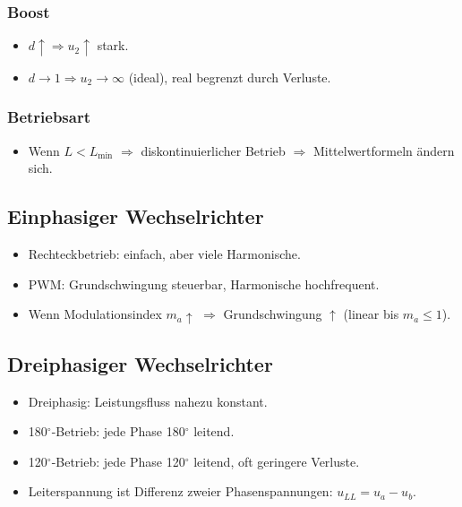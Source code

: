 \subsubsection{Boost}

\begin{itemize}
\item $d\uparrow \Rightarrow u_2\uparrow$ stark.
\item $d\rightarrow 1 \Rightarrow u_2 \rightarrow \infty$ (ideal), real begrenzt durch Verluste.
\end{itemize}

\subsubsection{Betriebsart}

\begin{itemize}
\item Wenn $L < L_{\min}$ $\Rightarrow$ diskontinuierlicher Betrieb $\Rightarrow$ Mittelwertformeln ändern sich.
\end{itemize}

\subsection{Einphasiger Wechselrichter}

\begin{itemize}
\item Rechteckbetrieb: einfach, aber viele Harmonische.
\item PWM: Grundschwingung steuerbar, Harmonische hochfrequent.
\item Wenn Modulationsindex $m_a\uparrow$ $\Rightarrow$ Grundschwingung $\uparrow$ (linear bis $m_a\le 1$).
\end{itemize}

\subsection{Dreiphasiger Wechselrichter}

\begin{itemize}
\item Dreiphasig: Leistungsfluss nahezu konstant.
\item 180$^\circ$-Betrieb: jede Phase 180$^\circ$ leitend.
\item 120$^\circ$-Betrieb: jede Phase 120$^\circ$ leitend, oft geringere Verluste.
\item Leiterspannung ist Differenz zweier Phasenspannungen: $u_{LL}=u_a-u_b$.
\end{itemize}

